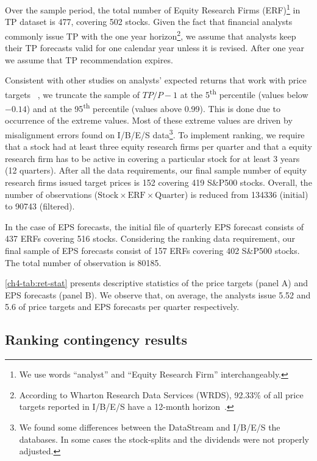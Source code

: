 \documentclass[a4paper,12pt,openright,notitlepage]{report}\usepackage[]{graphicx}\usepackage[]{color}
\begin{document}
Over the sample period, the total number of Equity Research Firms (ERF)\footnote{We use words ``analyst'' and ``Equity Research Firm'' interchangeably.} in TP dataset is 477, covering 502  stocks. Given the fact that financial analysts commonly issue TP with the one year horizon\footnote{According to Wharton Research Data Services (WRDS), 92.33\% of all price targets reported in I/B/E/S have a 12-month horizon~\citep{glushkov2009}.}, we assume that analysts keep their TP forecasts valid for one calendar year unless it is revised. After one year we assume that TP recommendation expires.

Consistent with other studies on analysts' expected returns that work with price targets ~\citep{bradshaw2002,brav2003,da2011}, we truncate the sample of $TP/P-1$ at the 5\textsuperscript{th} percentile (values below \ensuremath{-0.14}) and at the 95\textsuperscript{th} percentile (values above 0.99). This is done due to occurrence of the extreme values. Most of these extreme values are driven by misalignment errors found on I/B/E/S data\footnote{We found some differences between the  DataStream and I/B/E/S the databases. In some cases the stock-splits and the dividends were not properly adjusted.}. To implement ranking, we require that a stock had at least three equity research firms per quarter and that a equity research firm has to be active in covering a particular stock for at least 3 years (12 quarters). After all the  data requirements, our final sample number of equity research firms issued target prices is 152 covering 419 S\&P500 stocks. Overall, the number of observations ($\mathrm{Stock} \times \mathrm{ERF} \times  \mathrm{Quarter}$) is reduced  from 134336 (initial) to 90743 (filtered).

In the case of EPS forecasts, the initial file of quarterly EPS forecast consists of 437 ERFs covering 516 stocks. Considering the ranking data requirement, our final sample of EPS forecasts consist of  157 ERFs covering 402 S\&P500 stocks. The total number of observation is 80185.

\ref{ch4-tab:ret-stat} presents descriptive statistics of the price targets (panel A) and EPS forecasts (panel B). We observe that, on average, the analysts issue 5.52 and 5.6 of price targets and EPS forecasts per quarter respectively. 

\subsection{Ranking contingency results}
\label{ch4-tab:rank-contin}
\end{document}
